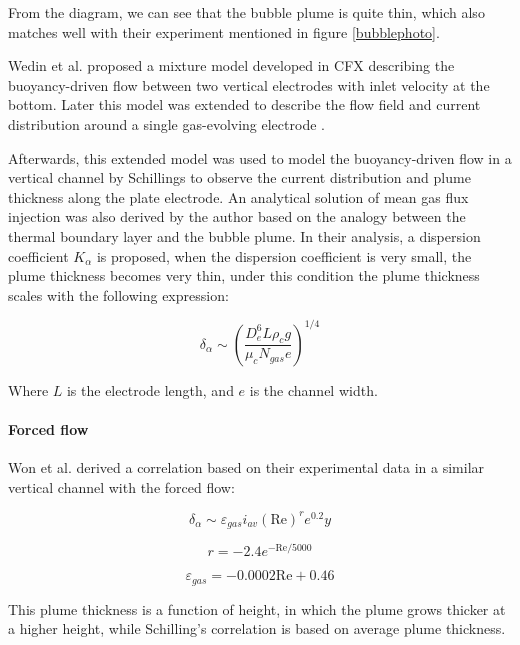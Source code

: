 From the diagram, we can see that the bubble plume is quite thin, which also matches well with their experiment mentioned in figure \ref{bubblephoto}.

Wedin et al. \cite{Wedin2001} proposed a mixture model developed in CFX describing the buoyancy-driven flow between two vertical electrodes with inlet velocity at the bottom. Later this model was extended to describe the flow field and current distribution around a single gas-evolving electrode \cite{Dahlkild2001}.

Afterwards, this extended model was used to model the buoyancy-driven flow in a vertical channel by Schillings \cite{Schillings2015} to observe the current distribution and plume thickness along the plate electrode. An analytical solution of mean gas flux injection was also derived by the author based on the analogy between the thermal boundary layer and the bubble plume. In their analysis, a dispersion coefficient $K_{\alpha}$ is proposed, when the dispersion coefficient is very small, the plume thickness becomes very thin, under this condition the plume thickness scales with the following expression:

\begin{equation}\label{eq:plumecorrelation}
    \delta_{\alpha} \sim (\frac{D_e^6L\rho_cg}{\mu_cN_{gas} e})^{1/4}
\end{equation}

Where $L$ is the electrode length, and $e$ is the channel width.


\paragraph{Forced flow}
\*


Won et al. \cite{Won} derived a correlation based on their experimental data in a similar vertical channel with the forced flow:

\begin{equation}
    \delta_{\alpha} \sim \varepsilon_{gas} i_{av} (\mathrm{Re})^r e^{0.2} y
\end{equation}

\begin{equation}
    r = -2.4 e^{-\mathrm{Re}/5000}
\end{equation}

\begin{equation}
    \varepsilon_{gas} = -0.0002 \mathrm{Re} + 0.46
\end{equation}

This plume thickness is a function of height, in which the plume grows thicker at a higher height, while Schilling's correlation is based on average plume thickness.

